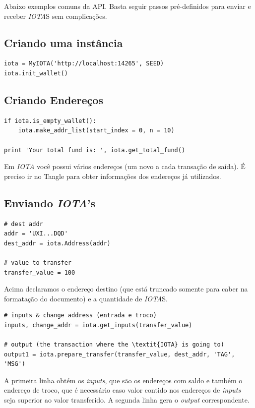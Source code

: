 \documentclass[a4paper]{article}
\begin{document}
Abaixo exemplos comuns da API. Basta seguir passos pré-definidos para enviar e receber \textit{IOTA}S sem complicações.

\subsection{Criando uma instância}
\begin{lstlisting}
iota = MyIOTA('http://localhost:14265', SEED)
iota.init_wallet()
\end{lstlisting}

\subsection{Criando Endereços}
\begin{lstlisting}
if iota.is_empty_wallet():
    iota.make_addr_list(start_index = 0, n = 10)
    
print 'Your total fund is: ', iota.get_total_fund()
\end{lstlisting}
    
Em \textit{IOTA} você possui vários endereços (um novo a cada transação de saída). É preciso ir no Tangle para obter
informações dos endereços já utilizados.

\subsection{Enviando \textit{IOTA}'s}

\begin{lstlisting}
# dest addr
addr = 'UXI...DQD'
dest_addr = iota.Address(addr)

# value to transfer
transfer_value = 100
\end{lstlisting}

Acima declaramos o endereço destino (que está truncado somente para caber na formatação do documento) e a quantidade de \textit{IOTA}S.

\begin{lstlisting}
# inputs & change address (entrada e troco)
inputs, change_addr = iota.get_inputs(transfer_value)

# output (the transaction where the \textit{IOTA} is going to)
output1 = iota.prepare_transfer(transfer_value, dest_addr, 'TAG', 'MSG')
\end{lstlisting}

A primeira linha obtém os \textit{inputs}, que são os endereços com saldo e também o endereço de troco, que é necessário caso valor
contido nos endereços de \textit{inputs} seja superior ao valor transferido. A segunda linha gera o \textit{output} correspondente.
\end{document}
